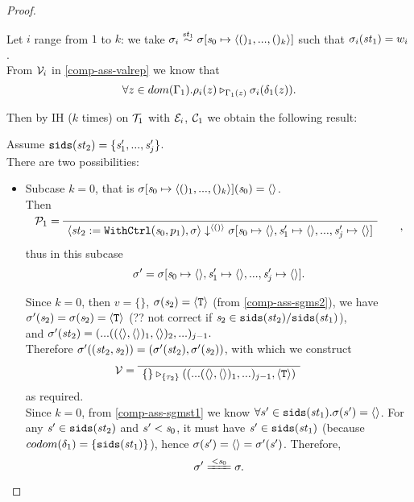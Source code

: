 \begin{proof}
\begin{itemize}
\begin{enumerate}[(i)]
	Let $i$ range from $1$ to $k$: we take $\sgm_i \~{\st_1} \sgm[\s_0 \|-> \<()_1,...,()_k \'>]$ 
	such that $\sigma_i(\mathit{st}_1)= w_i$. \\
	From $\mathcal{V}_i$ in \eqref{comp-ass-valrep} we know that  
	$$\forall z \in dom(\Gamma_1). \rho_i(z) \triangleright_{\Gamma_1(z)} \sigma_i(\delta_1(z)).$$
	
	
	Then  by IH ($k$ times) on $\mathcal{T}_1$ with $\mathcal{E}_i$, 
	$\mathcal{C}_1$ we obtain the following result:


	Assume $\mathtt{sids}(\mathit{st}_2) = \{\mathit{s}'_1,...,\mathit{s}'_j\}$.\\
	
	There are two possibilities:
	\begin{itemize}
	\item 
	Subcase $k=0$, that is $\sgmsz(\s_0) = \emptyv$.\\
	Then
	$$\PT{
		\AC{}
		\LeLa{\MP_1 = }
		\UC{\seval{\withctrl{\s_0}{p_1}{\st_2}}{\sgm}{\< () \'>}
			{\sgm[\s_0 \|-> \emptyv, \s_1' \|-> \emptyv, ..., \s_j' \|-> \emptyv]}}
	  },$$ 
    thus in this subcase 
    $$\sgm' = \sgm[\s_0 \|-> \emptyv, \s_1' \|-> \emptyv, ..., \s_j' \|-> \emptyv].$$ 

\def\sgmpempty{\sgm[\s_0 \|-> \emptyv, \s_1' \|-> \emptyv, ..., \s_j' \|-> \emptyv]}

	Since $k=0$, then $v = \{ \}$, $\sigma(\mathit{s}_2) = \langle \mathtt{T} \rangle$ (from \eqref{comp-ass-sgms2}), we have \\
	{\color{red} $\sigma'(\mathit{s}_2) = \sigma(\mathit{s}_2) = \langle \mathtt{T} \rangle$ (?? not correct if $\mathit{s}_2 \in \mathtt{sids}(\mathit{st}_2)/\mathtt{sids}(\mathit{st}_1)$)}, \\
	and $\sigma'(\mathit{st}_2) = (...((\langle \rangle,\langle \rangle)_1,\langle \rangle)_2,...)_{j-1}.$ \\
	
	Therefore $\sigma'((\mathit{st}_2,\mathit{s}_2)) = (\sigma'(\mathit{st}_2), \sigma'(\mathit{s}_2))$, with which we construct 
	$$\MV = 
	\PT{\Axiom{\ValRep{\{\}}{\tseq{\tau_2}}{((...(\emptyv,\emptyv)_1,...)_{j-1},\oT)}}}$$ 
	as required.\\
    
    Since $k=0$, from \eqref{comp-ass-sgmst1} we know $\forall s' \in \mathtt{sids}(\mathit{st}_1). \sigma(s') = \langle \rangle$. 
    For any $\mathit{s}' \in \mathtt{sids}(\mathit{st}_2)$ and $s' < \mathit{s}_0$, it must have $\mathit{s}' \in \mathtt{sids}(\mathit{st}_1)$ 
    (because $codom(\delta_1) = \{\mathtt{sids}(\mathit{st}_1)\}$), hence $\sigma(\mathit{s}') = \langle \rangle = \sigma'(\mathit{s}')$. 
    Therefore, $$\sgm' \ConEq{\s_0} \sgm.$$
    


\end{itemize}
\end{enumerate}
\end{itemize}
\end{proof}
